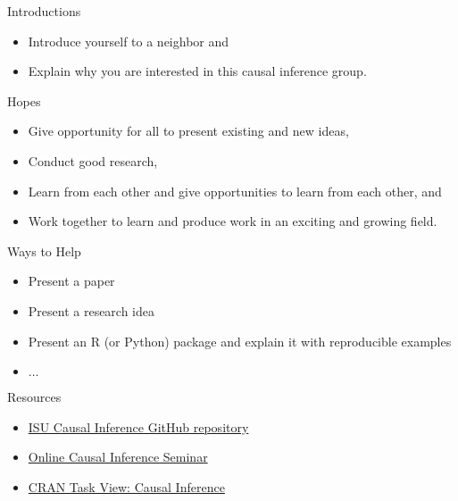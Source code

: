 \documentclass[handout]{beamer} %
\begin{document}
\begin{frame}{Introductions}

\begin{itemize}
    \item<2-> Introduce yourself to a neighbor and
    \item<2-> Explain why you are interested in this causal inference group.
\end{itemize}

    
\end{frame}

\begin{frame}{Hopes}

\begin{itemize}
    \item Give opportunity for all to present existing and new ideas,
    \item Conduct good research,
    \item Learn from each other and give opportunities to learn from each other, and
    \item Work together to learn and produce work in an exciting and growing field.
\end{itemize}
    
\end{frame}

\begin{frame}{Ways to Help}

\begin{itemize}
    \item Present a paper
    \item Present a research idea
    \item Present an R (or Python) package and explain it with reproducible examples
    \item $\dots$
\end{itemize}

\end{frame}

\begin{frame}{Resources}

\begin{itemize}
    \item \href{https://github.com/calebleedy/ISU-Causal}{ISU Causal Inference GitHub repository}
    \item \href{https://sites.google.com/view/ocis/}{Online Causal Inference Seminar}
    \item \href{https://cran.r-project.org/web/views/CausalInference.html}{CRAN Task View: Causal Inference}
\end{itemize}
    
\end{frame}
\end{document}
